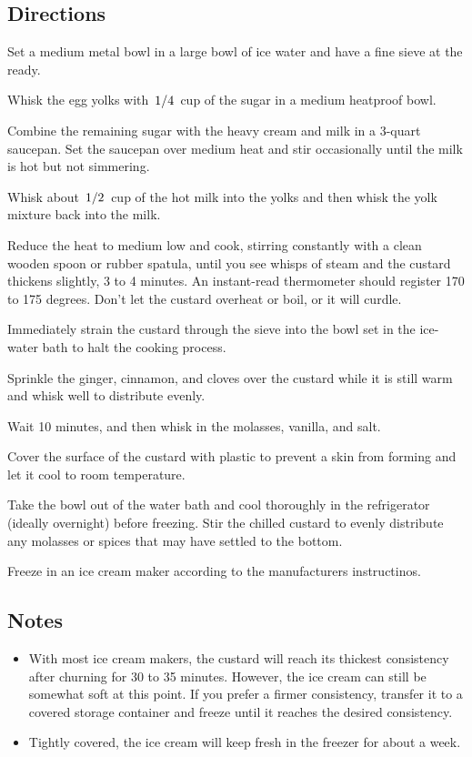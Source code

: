 \documentclass{article}
\newcounter{qcounter}
\begin{document}
\subsection*{Directions}
\begin{list}{:~}{}
\item Set a medium metal bowl in a large bowl of ice water and have a fine sieve at the ready.  
\item Whisk the egg yolks with $\left.1\middle/4\right.$ cup of the sugar in a medium heatproof bowl.  
\item Combine the remaining sugar with the heavy cream and milk in a 3-quart saucepan. Set the saucepan over medium 
heat and stir occasionally until the milk is hot but not simmering.  
\item Whisk about $\left.1\middle/2\right.$ cup of the hot milk into the yolks and then whisk the yolk mixture back into the milk.  
\item Reduce the heat to medium low and cook, stirring constantly with a clean wooden spoon or rubber spatula, until 
you see whisps of steam and the custard thickens slightly, 3 to 4 minutes.  An instant-read thermometer should register 
170 to 175 degrees.  Don't let the custard overheat or boil, or it will curdle.  
\item Immediately strain the custard through the sieve into the bowl set in the ice-water bath to halt the cooking process.  
\item Sprinkle the ginger, cinnamon, and cloves over the custard while it is still warm and whisk well to distribute evenly.  
\item Wait 10 minutes, and then whisk in the molasses, vanilla, and salt.  
\item Cover the surface of the custard with plastic to prevent a skin from forming and let it cool to room temperature.  
\item Take the bowl out of the water bath and cool thoroughly in the refrigerator (ideally overnight) before freezing.  
Stir the chilled custard to evenly distribute any molasses or spices that may have settled to the bottom.  
\item Freeze in an ice cream maker according to the manufacturers instructinos.  

\end{list}

\subsection*{Notes}
\begin{itemize}
\item With most ice cream makers, the custard will reach its thickest consistency after churning for 30 to 35 minutes.  
However, the ice cream can still be somewhat soft at this point.  If you prefer a firmer consistency, transfer it to a 
covered storage container and freeze until it reaches the desired consistency.  
\item Tightly covered, the ice cream will keep fresh in the freezer for about a week.
\end{itemize}
\end{document}
